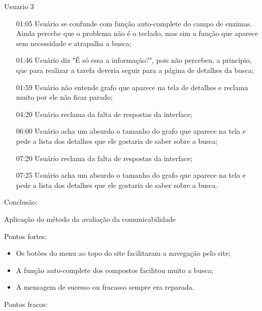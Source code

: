 Usuario 3
\begin{itemize}
\item[01:05] Usuário se confunde com função auto-complete do campo de enzimas. Ainda percebe que o problema não é o teclado, mas sim a função que aparece sem necessidade e atrapalha a busca;
\item[01:46] Usuário diz "É só essa a informação?", pois não percebeu, a princípio, que para realizar a tarefa deveria seguir para a página de detalhes da busca;
\item[01:59] Usuário não entende grafo que aparece na tela de detalhes e reclama muito por ele não ficar parado;
\item[04:20] Usuário reclama da falta de respostas da interface;
\item[06:00] Usuário acha um absurdo o tamanho do grafo que aparece na tela e pede a lista dos detalhes que ele gostaria de saber sobre a busca;
\item[07:20] Usuário reclama da falta de respostas da interface;
\item[07:25] Usuário acha um absurdo o tamanho do grafo que aparece na tela e pede a lista dos detalhes que ele gostaria de saber sobre a busca.
\end{itemize}









Conclusão:



Aplicação do método da avaliação da comunicabilidade

Pontos fortes: \\

\begin{itemize}
  \item Os botões do menu ao topo do site facilitaram a navegação pelo site;
  \item A função auto-complete dos compostos facilitou muito a busca;
  \item A mensagem de sucesso ou fracasso sempre era reparada.
\end{itemize}

 
Pontos fracos:\\

